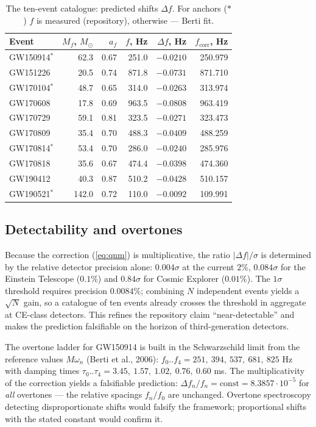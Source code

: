 \documentclass[11pt,a4paper]{article}
\begin{document}
\begin{table}[htbp]
\centering\small
\caption{The ten-event catalogue: predicted shifts $\Delta f$. For anchors
($\ast$) $f$ is measured (repository), otherwise --- Berti fit.}
\label{tab:qnm}
\begin{tabular}{lrrrrr}
\toprule
Event & $M_f$, $M_\odot$ & $a_f$ & $f$, Hz & $\Delta f$, Hz & $f_{\mathrm{corr}}$, Hz \\
\midrule
GW150914$^*$ & 62.3 & 0.67 & 251.0 & $-0.0210$ & 250.979 \\
GW151226 & 20.5 & 0.74 & 871.8 & $-0.0731$ & 871.710 \\
GW170104$^*$ & 48.7 & 0.65 & 314.0 & $-0.0263$ & 313.974 \\
GW170608 & 17.8 & 0.69 & 963.5 & $-0.0808$ & 963.419 \\
GW170729 & 59.1 & 0.81 & 323.5 & $-0.0271$ & 323.473 \\
GW170809 & 35.4 & 0.70 & 488.3 & $-0.0409$ & 488.259 \\
GW170814$^*$ & 53.4 & 0.70 & 286.0 & $-0.0240$ & 285.976 \\
GW170818 & 35.6 & 0.67 & 474.4 & $-0.0398$ & 474.360 \\
GW190412 & 40.3 & 0.87 & 510.2 & $-0.0428$ & 510.157 \\
GW190521$^*$ & 142.0 & 0.72 & 110.0 & $-0.0092$ & 109.991 \\
\bottomrule
\end{tabular}
\end{table}

\subsection{Detectability and overtones}

Because the correction (\ref{eq:qnm}) is multiplicative, the ratio
$|\Delta f|/\sigma$ is determined by the relative detector precision alone:
$0.004\sigma$ at the current $2\%$, $0.084\sigma$ for the Einstein Telescope
($0.1\%$) and $0.84\sigma$ for Cosmic Explorer ($0.01\%$). The $1\sigma$
threshold requires precision $0.0084\%$; combining $N$ independent events
yields a $\sqrt{N}$ gain, so a catalogue of ten events already crosses the
threshold in aggregate at CE-class detectors. This refines the repository
claim ``near-detectable'' and makes the prediction falsifiable on the horizon
of third-generation detectors.

The overtone ladder for GW150914 is built in the Schwarzschild limit from the
reference values $M\omega_n$ (Berti et al., 2006): $f_0..f_4 = 251,\ 394,\
537,\ 681,\ 825$ Hz with damping times $\tau_0..\tau_4 = 3.45,\ 1.57,\ 1.02,\
0.76,\ 0.60$ ms. The multiplicativity of the correction yields a falsifiable
prediction: $\Delta f_n / f_n = \mathrm{const} = 8.3857\cdot10^{-5}$ for
\emph{all} overtones --- the relative spacings $f_n/f_0$ are unchanged.
Overtone spectroscopy detecting disproportionate shifts would falsify the
framework; proportional shifts with the stated constant would confirm it.
\end{document}
